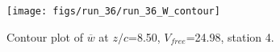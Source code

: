 \begin{figure}[H]
\centering
\texttt{[image: figs/run\_36/run\_36\_W\_contour]}
\caption{Contour plot of $\overline{w}$ at $z/c$=8.50, $V_{free}$=24.98, station 4.}
\label{fig:run_36_W_contour}
\end{figure}


